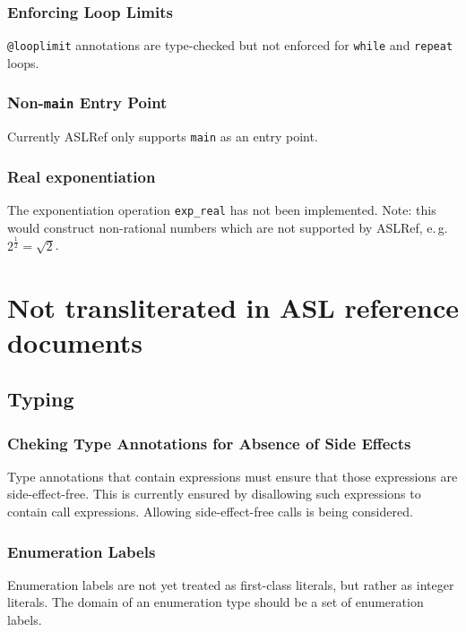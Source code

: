 \documentclass{book}
\begin{document}
\subsection{Enforcing Loop Limits}
\verb|@looplimit| annotations are type-checked but not enforced for \texttt{while} and \texttt{repeat} loops.

\subsection{Non-\texttt{main} Entry Point}
Currently ASLRef only supports \texttt{main} as an entry point.

\subsection{Real exponentiation}
The exponentiation operation \texttt{exp\_real} has not been implemented.
%
Note: this would construct non-rational numbers which are not supported by
ASLRef, e.\,g.\ $2^\frac{1}{2} = \sqrt{2}$.


\chapter{Not transliterated in ASL reference documents}

\section{Typing}

\subsection{Cheking Type Annotations for Absence of Side Effects}
Type annotations that contain expressions must ensure that those expressions are side-effect-free.
This is currently ensured by disallowing such expressions to contain call expressions.
Allowing side-effect-free calls is being considered.

\subsection{Enumeration Labels}
Enumeration labels are not yet treated as first-class literals, but rather as integer literals.
The domain of an enumeration type should be a set of enumeration labels.
\end{document}
